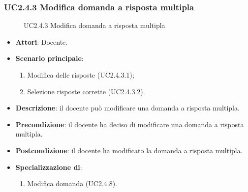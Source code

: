 \subsubsection{UC2.4.3 Modifica domanda a risposta multipla}
\begin{figure}[H]
\centering
\noindent{}
\caption{UC2.4.3 Modifica domanda a risposta multipla}
\end{figure}
\begin{itemize}
\item \textbf{Attori}: Docente.
\item \textbf{Scenario principale}:
\begin{enumerate}
\item Modifica delle risposte (UC2.4.3.1);
\item Selezione risposte corrette (UC2.4.3.2).
\end{enumerate}
\item \textbf{Descrizione}: il docente può modificare una domanda a risposta multipla.
\item \textbf{Precondizione}: il docente ha deciso di modificare una domanda a risposta multipla.
\item \textbf{Postcondizione}: il docente ha modificato la domanda a risposta multipla.
\item \textbf{Specializzazione di}:
\begin{enumerate}
\item Modifica domanda (UC2.4.8).
\end{enumerate}
\end{itemize}

